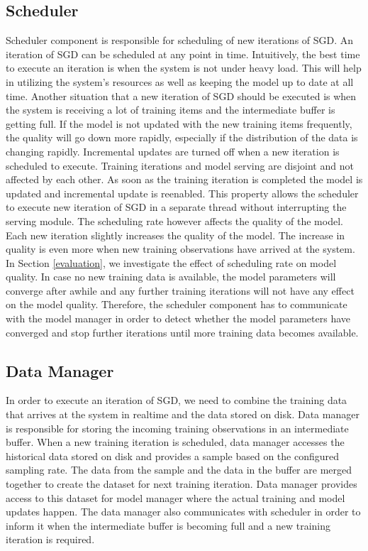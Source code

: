 \documentclass{sig-alternate-05-2015}
\begin{document}
\subsection{Scheduler}\label{scheduler}
Scheduler component is responsible for scheduling of new iterations of SGD.
An iteration of SGD can be scheduled at any point in time.
Intuitively, the best time to execute an iteration is when the system is not under heavy load.
This will help in utilizing the system's resources as well as keeping the model up to date at all time.
Another situation that a new iteration of SGD should be executed is when the system is receiving a lot of training items and the intermediate buffer is getting full.
If the model is not updated with the new training items frequently, the quality will go down more rapidly, especially if the distribution of the data is changing rapidly.
Incremental updates are turned off when a new iteration is scheduled to execute.
Training iterations and model serving are disjoint and not affected by each other.
As soon as the training iteration is completed the model is updated and incremental update is reenabled.
This property allows the scheduler to execute new iteration of SGD in a separate thread without interrupting the serving module.
The scheduling rate however affects the quality of the model.
Each new iteration slightly increases the quality of the model.
The increase in quality is even more when new training observations have arrived at the system.
In Section \ref{evaluation}, we investigate the effect of scheduling rate on model quality.
In case no new training data is available, the model parameters will converge after awhile and any further training iterations will not have any effect on the model quality.
Therefore, the scheduler component has to communicate with the model manager in order to detect whether the model parameters have converged and stop further iterations until more training data becomes available.


\subsection{Data Manager} \label{data-manager}
In order to execute an iteration of SGD, we need to combine the training data that arrives at the system in realtime and the data stored on disk.
Data manager is responsible for storing the incoming training observations in an intermediate buffer.
When a new training iteration is scheduled, data manager accesses the historical data stored on disk and provides a sample based on the configured sampling rate.
The data from the sample and the data in the buffer are merged together to create the dataset for next training iteration.
Data manager provides access to this dataset for model manager where the actual training and model updates happen.
The data manager also communicates with scheduler in order to inform it when the intermediate buffer is becoming full and a new training iteration is required. 
\end{document}
